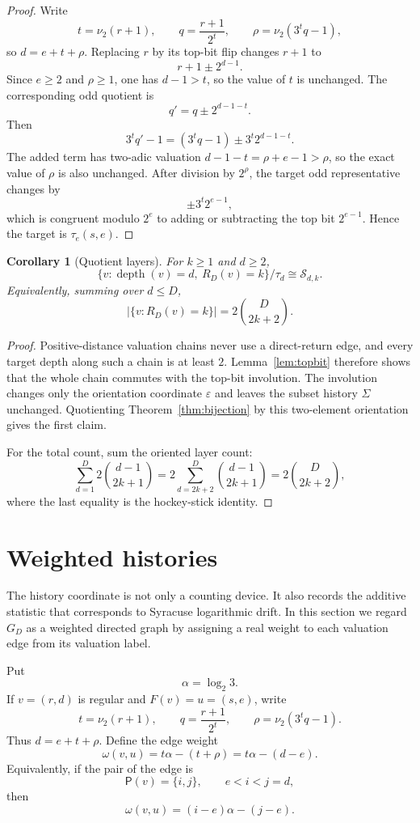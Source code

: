\documentclass[11pt]{amsart}
\newtheorem{corollary}[theorem]{Corollary}
\theoremstyle{definition}
\theoremstyle{remark}
\newcommand{\nuu}{\nu_2}
\newcommand{\depth}{\operatorname{depth}}
\newcommand{\Pair}{\mathsf P}
\newcommand{\Sfam}{\mathcal S}
\newcommand{\eps}{\varepsilon}
\begin{document}
\begin{proof}
Write
\[
t=\nuu(r+1),\qquad q=\frac{r+1}{2^t},\qquad \rho=\nuu(3^tq-1),
\]
so $d=e+t+\rho$.  Replacing $r$ by its top-bit flip changes $r+1$ to
\[
r+1\pm2^{d-1}.
\]
Since $e\ge2$ and $\rho\ge1$, one has $d-1>t$, so the value of $t$ is unchanged.  The corresponding odd quotient is
\[
q'=q\pm2^{d-1-t}.
\]
Then
\[
3^tq'-1=(3^tq-1)\pm3^t2^{d-1-t}.
\]
The added term has two-adic valuation $d-1-t=\rho+e-1>\rho$, so the exact value of $\rho$ is also unchanged.  After division by $2^\rho$, the target odd representative changes by
\[
\pm 3^t2^{e-1},
\]
which is congruent modulo $2^e$ to adding or subtracting the top bit $2^{e-1}$.  Hence the target is $\tau_e(s,e)$.
\end{proof}

\begin{corollary}[Quotient layers]\label{cor:quotient}
For $k\ge1$ and $d\ge2$,
\[
\{v:\depth(v)=d,\ R_D(v)=k\}/\tau_d
\cong
\Sfam_{d,k}.
\]
Equivalently, summing over $d\le D$,
\[
\bigl|\{v:R_D(v)=k\}\bigr|=2\binom{D}{2k+2}.
\]
\end{corollary}

\begin{proof}
Positive-distance valuation chains never use a direct-return edge, and every target depth along such a chain is at least $2$.  Lemma~\ref{lem:topbit} therefore shows that the whole chain commutes with the top-bit involution.  The involution changes only the orientation coordinate $\eps$ and leaves the subset history $\Sigma$ unchanged.  Quotienting Theorem~\ref{thm:bijection} by this two-element orientation gives the first claim.

For the total count, sum the oriented layer count:
\[
\sum_{d=1}^D2\binom{d-1}{2k+1}
=
2\sum_{d=2k+2}^D\binom{d-1}{2k+1}
=
2\binom{D}{2k+2},
\]
where the last equality is the hockey-stick identity.
\end{proof}

\section{Weighted histories}\label{sec:weighted}

The history coordinate is not only a counting device.  It also records the additive statistic that corresponds to Syracuse logarithmic drift.  In this section we regard $G_D$ as a weighted directed graph by assigning a real weight to each valuation edge from its valuation label.

Put
\[
\alpha=\log_2 3.
\]
If $v=(r,d)$ is regular and $F(v)=u=(s,e)$, write
\[
t=\nuu(r+1),\qquad q=\frac{r+1}{2^t},\qquad \rho=\nuu(3^tq-1).
\]
Thus $d=e+t+\rho$.  Define the edge weight
\[
\omega(v,u)=t\alpha-(t+\rho)=t\alpha-(d-e).
\]
Equivalently, if the pair of the edge is
\[
\Pair(v)=\{i,j\},\qquad e<i<j=d,
\]
then
\[
\omega(v,u)=(i-e)\alpha-(j-e).
\]
\end{document}
